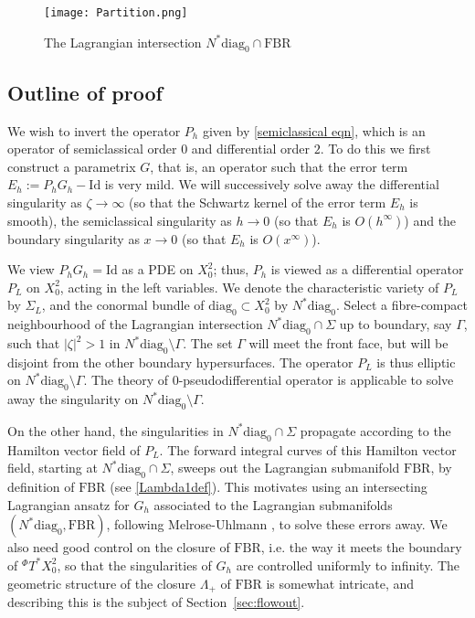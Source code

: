 \documentclass[10pt, a4paper, twoside]{amsart}
\numberwithin{equation}{section}
\theoremstyle{remark}
\begin{document}
\begin{center}\begin{figure}
\texttt{[image: Partition.png]}\caption{\label{fig: cotangent bundle decomposition}The Lagrangian intersection  $N^* {\mathrm{diag}_0} \cap {\mathrm{FBR}}$}\end{figure}\end{center}

\subsection{Outline of proof}\label{subsec:outline}
We wish to invert the  operator $P_h$ given by \eqref{semiclassical eqn}, which is an operator of semiclassical order $0$ and differential order $2$. To do this we first construct a parametrix $G$, that is, an operator such that the error term $E_h := P_h G_h - {\mathrm{Id}}$ is very mild. 
We will successively solve away the differential singularity as $\zeta \rightarrow \infty$ (so that the Schwartz kernel of the error term $E_h$ is smooth), the semiclassical singularity as $h \rightarrow 0$ (so that $E_h$ is $O(h^\infty)$) and the boundary singularity as $x \to 0$ (so that $E_h$ is $O(x^\infty)$). 

We view $P_h G_h = {\mathrm{Id}}$ as a PDE on $X^2_0$; thus, $P_h$ is viewed as a differential operator $P_L$ on $X^2_0$, acting in the left variables. We denote  the characteristic variety of $P_L$ by $\Sigma_L$, and the conormal bundle of ${\mathrm{diag}_0} \subset X^2_0$ by $N^* {\mathrm{diag}_0}$. 
Select a fibre-compact neighbourhood of the Lagrangian intersection $N^* {\mathrm{diag}_0} \cap \Sigma$ up to boundary, say $\Gamma$, such that $|\zeta|^2  > 1$ in $N^* {\mathrm{diag}_0} \setminus \Gamma$. The set $\Gamma$ will meet the front face, but will be disjoint from the other boundary hypersurfaces. The operator $P_L$ is thus elliptic on $N^* {\mathrm{diag}_0} \setminus \Gamma$. The theory of $0$-pseudodifferential operator is applicable to solve away the singularity on $N^* {\mathrm{diag}_0} \setminus \Gamma$.

On the other hand, the singularities in $N^* {\mathrm{diag}_0} \cap \Sigma$ propagate according to the Hamilton vector field of $P_L$. The forward integral curves of this Hamilton vector field, starting at $N^* {\mathrm{diag}_0} \cap \Sigma$, sweeps out the Lagrangian submanifold ${\mathrm{FBR}}$, by definition of ${\mathrm{FBR}}$ (see \eqref{Lambda1def}). 
This motivates using an intersecting Lagrangian ansatz for $G_h$ associated to the Lagrangian submanifolds $(N^* {\mathrm{diag}_0}, {\mathrm{FBR}})$, following Melrose-Uhlmann \cite{Melrose-Uhlmann-CPAM-1979}, to solve these errors away. We also need good control on the closure of ${\mathrm{FBR}}$, i.e. the way it meets the boundary of ${}^\Phi T^* X^2_0$, so that the singularities of $G_h$ are controlled uniformly to infinity. 
 The geometric structure of the closure $\Lambda_+$ of ${\mathrm{FBR}}$ is somewhat intricate, and describing this is the subject of Section~\ref{sec:flowout}. 
\end{document}
